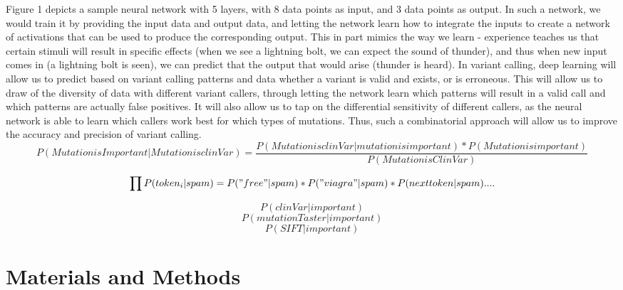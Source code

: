 \documentclass{article}
\begin{document}
Figure 1 depicts a sample neural network with 5 layers, with 8 data points as input, and 3 data points as output. In such a network, we would train it by providing the input data and output data, and letting the network learn how to integrate the inputs to create a network of activations that can be used to produce the corresponding output. This in part mimics the way we learn - experience teaches us that certain stimuli will result in specific effects (when we see a lightning bolt, we can expect the sound of thunder), and thus when new input comes in (a lightning bolt is seen), we can predict that the output that would arise (thunder is heard). In variant calling, deep learning will allow us to predict based on variant calling patterns and data whether a variant is valid and exists, or is erroneous. This will allow us to draw of the diversity of data with different variant callers, through letting the network learn which patterns will result in a valid call and which patterns are actually false positives. It will also allow us to tap on the differential sensitivity of different callers, as the neural network is able to learn which callers work best for which types of mutations. Thus, such a combinatorial approach will allow us to improve the accuracy and precision of variant calling.\\


\begin{equation}
P(Mutation is Important | Mutation is clinVar) = \frac{P(Mutation is clinVar | mutation is important)* P(Mutation is important)}{P(Mutation is ClinVar)}
\end{equation}


\begin{equation}
\prod P(token_i | spam) = P("free" | spam)* P("viagra"|spam)*P(next token|spam)....
\end{equation}

\begin{equation}
P(clinVar | important) 
\end{equation}
\begin{equation}
P(mutationTaster | important)
\end{equation}
\begin{equation}
P(SIFT | important)
\end{equation}

\section{Materials and Methods}
\end{document}
